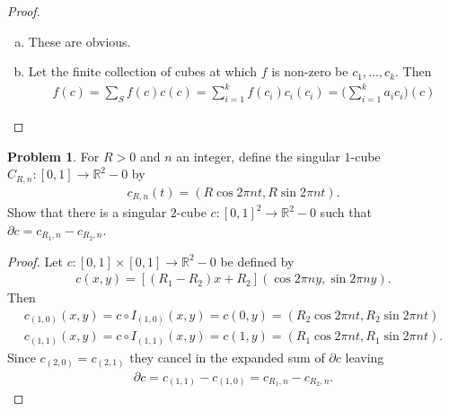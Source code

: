 \documentclass[20pt]{article}
\theoremstyle{plain}
\theoremstyle{definition}
\newtheorem*{problem}{Problem}
\newcommand{\reals}{\mathbb{R}}
\begin{document}
\begin{proof}
  \begin{enumerate}[(a)]
    \item 
      These are obvious.
    \item 
      Let the finite collection of cubes at which $f$ is non-zero be 
      $c_1, ..., c_k$.  Then 
      \begin{align*}
        f(c) = \sum_S f(c)c(c) = \sum_{i=1}^kf(c_i)c_i(c_i) = \bigg(\sum_{i=1}^ka_i c_i\bigg)(c)
      \end{align*}
  \end{enumerate}
\end{proof}









\begin{problem}{2.23}
  For $R > 0$ and $n$ an integer, define the singular $1$-cube 
  $C_{R, n} : [0, 1] \to \reals^2 - 0$ by
  \begin{align*}
    c_{R, n}(t) = (R \cos 2 \pi n t, R \sin 2 \pi n t).
  \end{align*}
  Show that there is a singular $2$-cube $c: [0,1]^2 \to \reals^2- 0$
   such that $\partial c = c_{R_1, n} - c_{R_2, n}$.
\end{problem}

\begin{proof}
  Let $c: [0, 1] \times [0,1] \to \reals^2 - 0$ be defined by 
  \begin{align*}
    c(x, y) = [(R_1 - R_2)x + R_2](\cos2 \pi n y ,\sin2 \pi n y).
  \end{align*}
  Then 
  \begin{align*}
    c_{(1, 0)}(x, y) = 
    c \circ I_{(1, 0)}(x, y) = 
    c(0, y) = 
    (R_2 \cos 2 \pi n t, R_2 \sin 2 \pi n t) \\
    c_{(1, 1)}(x, y) = 
    c \circ I_{(1, 1)}(x, y) = 
    c(1, y) = 
    (R_1 \cos 2 \pi n t, R_1 \sin 2 \pi n t).
  \end{align*}
  Since $c_{(2, 0)} = c_{(2, 1)}$ they cancel in the expanded sum of $\partial c$ leaving
  \begin{align*}
    \partial c = c_{(1, 1)} - c_{(1, 0)} = c_{R_1, n} - c_{R_2, n}.
  \end{align*}
\end{proof}
\end{document}
